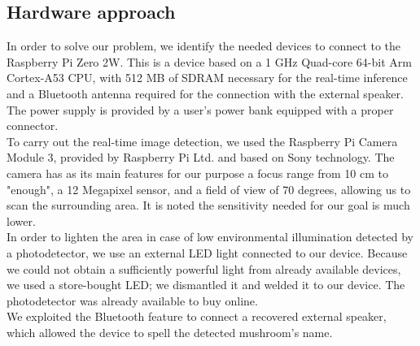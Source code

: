 \documentclass[conference]{IEEEtran}
\begin{document}
\subsection{Hardware approach}
In order to solve our problem, we identify the needed devices to connect to the Raspberry Pi Zero 2W. This is a device based on a 1 GHz Quad-core 64-bit Arm Cortex-A53 CPU, with 512 MB of SDRAM necessary for the real-time inference and a Bluetooth antenna required for the connection with the external speaker. The power supply is provided by a user's power bank equipped with a proper connector.\\
To carry out the real-time image detection, we used the Raspberry Pi Camera Module 3, provided by Raspberry Pi Ltd. and based on Sony technology. The camera has as its main features for our purpose a focus range from 10 cm to "enough", a 12 Megapixel sensor, and a field of view of 70 degrees, allowing us to scan the surrounding area. It is noted the sensitivity needed for our goal is much lower.\\
In order to lighten the area in case of low environmental illumination detected by a photodetector, we use an external LED light connected to our device. Because we could not obtain a sufficiently powerful light from already available devices, we used a store-bought LED; we dismantled it and welded it to our device. The photodetector was already available to buy online.\\
We exploited the Bluetooth feature to connect a recovered external speaker, which allowed the device to spell the detected mushroom's name.
\end{document}

